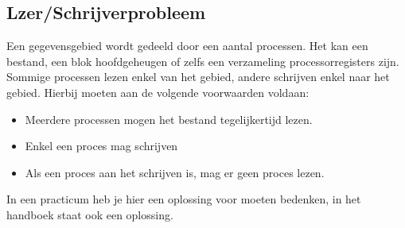 \subsection{Lzer/Schrijverprobleem}

Een gegevensgebied wordt gedeeld door een aantal processen. Het kan een bestand, een blok hoofdgeheugen of zelfs een verzameling processorregisters zijn. Sommige processen lezen enkel van het gebied, andere schrijven enkel naar het gebied.
Hierbij moeten aan de volgende voorwaarden voldaan:

\begin{itemize}
\item Meerdere processen mogen het bestand tegelijkertijd lezen.
\item Enkel een proces mag schrijven
\item Als een proces aan het schrijven is, mag er geen proces lezen.
\end{itemize}

In een practicum heb je hier een oplossing voor moeten bedenken, in het handboek staat ook een oplossing.